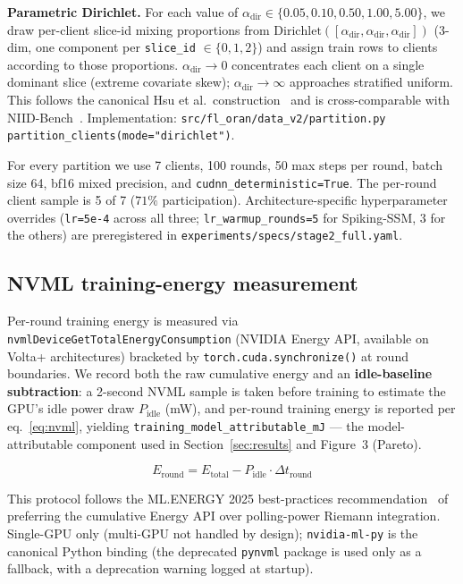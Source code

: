 \documentclass[journal]{IEEEtran}
\newcommand{\alphadir}{\ensuremath{\alpha_{\mathrm{dir}}}}
\begin{document}
\textbf{Parametric Dirichlet.} For each value of $\alphadir \in \{0.05, 0.10, 0.50, 1.00, 5.00\}$, we draw per-client slice-id mixing proportions from $\mathrm{Dirichlet}([\alphadir, \alphadir, \alphadir])$ (3-dim, one component per \lstinline|slice_id| $\in\{0, 1, 2\}$) and assign train rows to clients according to those proportions. $\alphadir \rightarrow 0$ concentrates each client on a single dominant slice (extreme covariate skew); $\alphadir \rightarrow \infty$ approaches stratified uniform. This follows the canonical Hsu et al.\ construction~\cite{Hsu2019_Dirichlet} and is cross-comparable with NIID-Bench~\cite{Li2022_NIIDBench}. Implementation: \lstinline|src/fl_oran/data_v2/partition.py partition_clients(mode="dirichlet")|.

For every partition we use 7 clients, 100 rounds, 50 max steps per round, batch size 64, bf16 mixed precision, and \lstinline|cudnn_deterministic=True|. The per-round client sample is 5 of 7 ($71\%$ participation). Architecture-specific hyperparameter overrides (\lstinline|lr=5e-4| across all three; \lstinline|lr_warmup_rounds=5| for Spiking-SSM, 3 for the others) are preregistered in \lstinline|experiments/specs/stage2_full.yaml|.

\subsection{NVML training-energy measurement}

Per-round training energy is measured via \lstinline|nvmlDeviceGetTotalEnergyConsumption| (NVIDIA Energy API, available on Volta+ architectures) bracketed by \lstinline|torch.cuda.synchronize()| at round boundaries. We record both the raw cumulative energy and an \textbf{idle-baseline subtraction}: a 2-second NVML sample is taken before training to estimate the GPU's idle power draw $P_{\mathrm{idle}}$ (mW), and per-round training energy is reported per eq.~\eqref{eq:nvml}, yielding \lstinline|training_model_attributable_mJ| --- the model-attributable component used in Section~\ref{sec:results} and Figure~3 (Pareto).

\begin{equation}\label{eq:nvml}
  E_{\mathrm{round}} = E_{\mathrm{total}} - P_{\mathrm{idle}} \cdot \Delta t_{\mathrm{round}}
\end{equation}

This protocol follows the ML.ENERGY 2025 best-practices recommendation~\cite{Chung2025_MLEnergy} of preferring the cumulative Energy API over polling-power Riemann integration. Single-GPU only (multi-GPU not handled by design); \lstinline|nvidia-ml-py| is the canonical Python binding (the deprecated \lstinline|pynvml| package is used only as a fallback, with a deprecation warning logged at startup).
\end{document}
